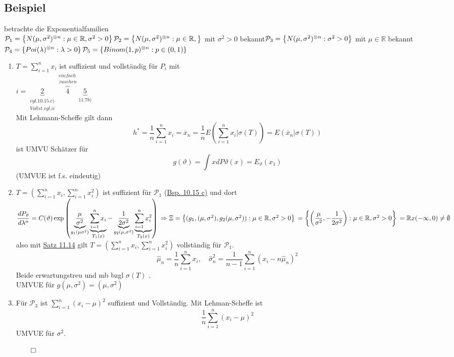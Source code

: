 \documentclass[german,10pt,oneside, fleqn, a4paper]{article}
\newcommand {\R}	{\mathbb{R}}
\newcommand{\Ra}	{\Rightarrow}
\newcommand{\sm}[2][\infty]{\sum\limits_{#2}^{#1}}
\newcommand{\brc}[1]{\left(#1\right)}
\newcommand{\brac}[1]{\left\lbrace #1\right\rbrace}
\newcommand{\QED}{\begin{flushright}$\qed$\end{flushright}}
\newcommand{\mc}[1]{\mathcal{#1}}
\newcommand{\1}[1]{1_{#1}}
\newcommand{\2}[1]{\1{\brac{#1}}}
\newcommand{\p}{\mc{P}}
\newcommand{\sumi}{\sm[n]{i=1}}
\newcommand{\stuff}{{\otimes n}}
\begin{document}
\subsection{Beispiel}
\label{11.15}
betrachte die Exponentialfamilien\\
$\p_1=\brac{N(\mu,\sigma^2)^\stuff:\mu\in\R,\sigma^2>0}\\
\p_2=\brac{N(\mu,\sigma^2)^\stuff:\mu\in\R,}$ mit $\sigma^2>0$ bekannt$\\
\p_3=\brac{N(\mu,\sigma^2)^\stuff:\sigma^2>0}$ mit $\mu\in\R$ bekannt\\
$\p_4=\brac{Poi(\lambda)^\stuff:\lambda>0}\\
\p_5=\brac{Binom(1,p)^\stuff:p\in(0,1)}$
\begin{enumerate}[label=(\roman*)]
\item $T=\sumi x_i $ ist suffizient und vollständig für $P_i$ mit \\
$i=\underbrace{2}_{\substack{\hyperref[10.15]{vgl. 10.15.c)}\\Vollst.vgl.ii}}\overbrace{4}^{\substack{einfach \\zu sehen}}\underbrace{5}_{\hyperref[11.7]{11.7 b)}}$\\
Mit Lehmann-Scheffe gilt dann \[
h^*=\dfrac{1}{n}\sumi x_i=\overline{x}_n=\dfrac{1}{n}E\brc{\sumi x_i|\sigma(T)}=E(\overline{x}_n|\sigma(T))\]
ist UMVU Schätzer für \[
g(\vartheta)=\int xdP\vartheta(x)=E_\vartheta(x_1)\]
(UMVUE ist f.s. eindeutig)

\item $T=\brc{\sumi x_i,\sumi x_i^2}$ ist suffizient für $\p_1$ (\hyperref[10.15]{Bsp. 10.15 c)} und dort $\\
\dfrac{dP_\vartheta}{d\lambda^n}=C(\vartheta)\exp\brc{\underbrace{\dfrac{\mu}{\sigma^2}}_{g_1(\mu\sigma^2)}\underbrace{\sumi x_i}_{T_1(x)}-\underbrace{\dfrac{1}{2\sigma^2}}_{g_2(\mu,\sigma^2)}\underbrace{\sumi x_i^2}_{T_2(x)}}\\
\Ra\Xi=\brac{(g_1,(\mu,\sigma^2),g_2(\mu,\sigma^2)):\mu\in\R,\sigma^2>0}\\
=\brac{\brc{\dfrac{\mu}{\sigma^2},-\dfrac{1}{2\sigma^2}}:\mu\in\R,\sigma^2>0}\\
=\R x(-\infty,0)\neq\emptyset$\\
also mit \hyperref[11.14]{Satz 11.14} gilt $T=\brc{\sumi x_i,\sumi x_i^2}$ vollständig für $\p_1$.\[
\widehat{\mu}_n=\dfrac{1}{n}\sumi x_i,\quad \widehat{\sigma}_n^2=\dfrac{1}{n-1}\sumi(x_i-n\widehat{\mu}_n)^2\] Beide erwartungstreu und mb bzgl $\sigma(T)$ .\\
UMVUE für $g(\mu,\sigma^2)=(\mu,\sigma^2)$
\item Für $\p_3$ ist $\sumi (x_i-\mu)^2$ suffizient und Vollständig. Mit Lehman-Scheffe ist \[\dfrac{1}{n}\sumi(x_i-\mu)^2\] UMVUE für $\sigma^2$.\QED
\end{enumerate}
\end{document}
